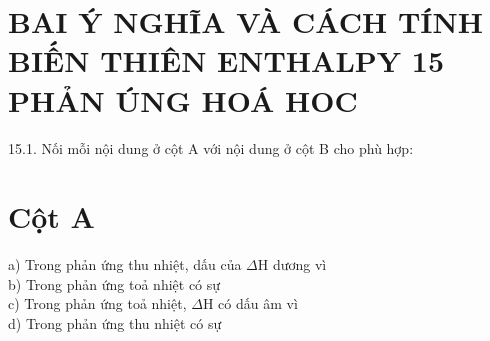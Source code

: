 \documentclass[10pt]{article}
\begin{document}
\section*{BAI Ý NGHĨA VÀ CÁCH TÍNH BIẾN THIÊN ENTHALPY 15 PHẢN ÚNG HOÁ HOC}
15.1. Nối mỗi nội dung ở cột A với nội dung ở cột B cho phù hợp:

\section*{Cột A}
a) Trong phản ứng thu nhiệt, dấu của $\Delta \mathrm{H}$ dương vì\\
b) Trong phản ứng toả nhiệt có sự\\
c) Trong phản ứng toả nhiệt, $\Delta \mathrm{H}$ có dấu âm vì\\
d) Trong phản ứng thu nhiệt có sự
\end{document}
